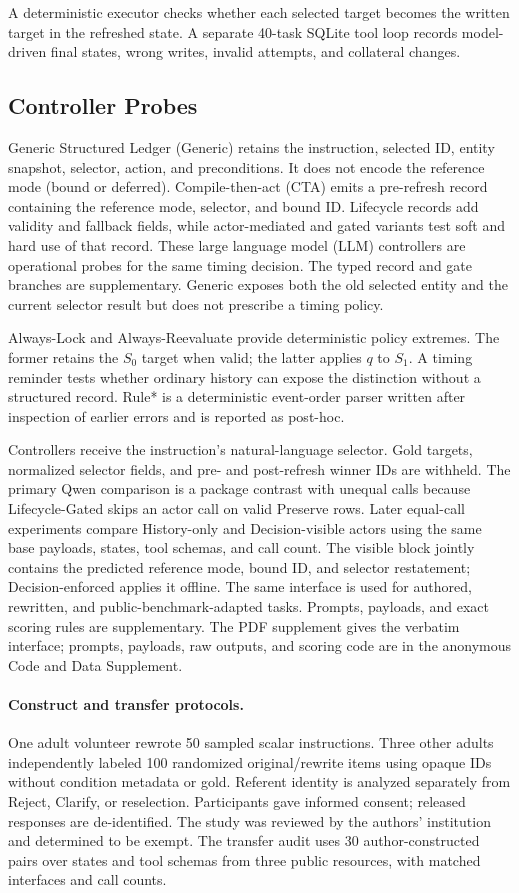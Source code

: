 \documentclass[letterpaper]{article}
\begin{document}
A deterministic executor checks whether each selected target becomes the written target in the
refreshed state. A separate 40-task SQLite tool loop records model-driven final states, wrong
writes, invalid attempts, and collateral changes.

\subsection{Controller Probes}
Generic Structured Ledger (Generic) retains the instruction, selected ID, entity snapshot,
selector, action, and preconditions. It does not encode the reference mode (bound or deferred).
Compile-then-act (CTA) emits a pre-refresh record containing the reference mode, selector, and bound
ID. Lifecycle records add validity and
fallback fields, while actor-mediated and gated variants test soft and hard use of that record.
These large language model (LLM) controllers are operational probes for the same timing decision.
The typed record and gate branches are supplementary. Generic exposes both the old selected entity
and the current selector result but does not prescribe a timing policy.

Always-Lock and Always-Reevaluate provide deterministic policy extremes. The former retains the
$S_0$ target when valid; the latter applies $q$ to $S_1$. A timing reminder tests whether ordinary
history can expose the distinction without a structured record. Rule* is a deterministic
event-order parser written after inspection of earlier errors and is reported as post-hoc.

Controllers receive the instruction's natural-language selector. Gold targets, normalized
selector fields, and pre- and post-refresh winner IDs are withheld. The primary Qwen comparison is
a package contrast with unequal calls because Lifecycle-Gated skips an actor call on valid Preserve
rows. Later equal-call experiments compare History-only and Decision-visible actors using the same
base payloads, states, tool schemas, and call count. The visible block jointly contains the predicted
reference mode, bound ID, and selector restatement; Decision-enforced applies it offline. The same interface
is used for authored, rewritten, and public-benchmark-adapted tasks. Prompts, payloads, and exact
scoring rules are supplementary. The PDF supplement gives the verbatim interface; prompts,
payloads, raw outputs, and scoring code are in the anonymous Code and Data Supplement.

\paragraph{Construct and transfer protocols.}
One adult volunteer rewrote 50 sampled scalar instructions. Three other adults independently
labeled 100 randomized original/rewrite items using opaque IDs without condition metadata or gold.
Referent identity is analyzed separately from Reject, Clarify, or reselection. Participants gave
informed consent; released responses are de-identified. The study was reviewed by the authors'
institution and determined to be exempt. The transfer audit uses 30 author-constructed pairs over states and tool
schemas from three public resources, with matched interfaces and call counts.
\end{document}
